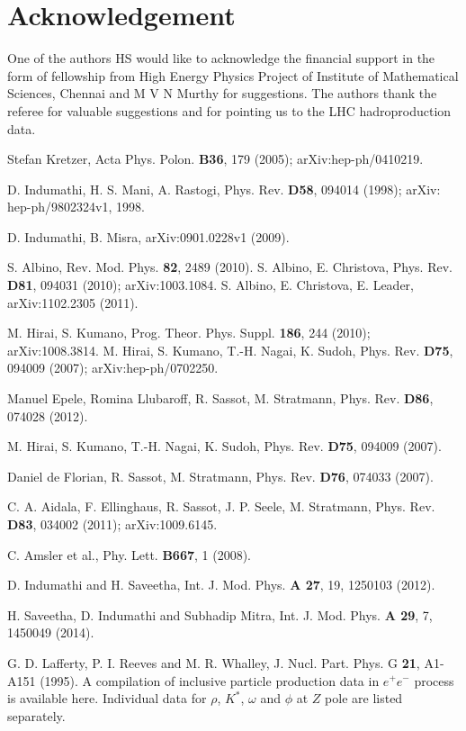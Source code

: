 \documentclass{ws-ijmpa}
\begin{document}
\section*{Acknowledgement}
\label{Acknow}
One of the authors HS would like to acknowledge the financial support
in the form of fellowship from High Energy Physics Project of Institute
of Mathematical Sciences, Chennai and M V N Murthy for suggestions. The
authors thank the referee for valuable suggestions and for pointing us
to the LHC hadroproduction data.

\begin{thebibliography}{99}
Stefan Kretzer, Acta Phys. Polon. {\bf B36}, 179 (2005); arXiv:hep-ph/0410219.

D. Indumathi, H. S. Mani, A. Rastogi, Phys. Rev. {\bf D58}, 094014
(1998); arXiv: hep-ph/9802324v1, 1998.

D. Indumathi, B. Misra, arXiv:0901.0228v1 (2009).

S. Albino, Rev. Mod. Phys. {\bf 82}, 2489 (2010).
S. Albino, E. Christova, Phys. Rev. {\bf D81}, 094031 (2010); arXiv:1003.1084.
S. Albino, E. Christova, E. Leader, arXiv:1102.2305 (2011).

M. Hirai, S. Kumano, Prog. Theor. Phys. Suppl. {\bf 186}, 244 (2010);
arXiv:1008.3814.
M. Hirai, S. Kumano, T.-H. Nagai, K. Sudoh, Phys. Rev. {\bf D75},
094009 (2007); arXiv:hep-ph/0702250.

Manuel Epele, Romina Llubaroff, R. Sassot, M. Stratmann, Phys. Rev. {\bf D86}, 074028 (2012).

M. Hirai, S. Kumano, T.-H. Nagai, K. Sudoh, Phys. Rev. {\bf D75}, 094009 (2007).

Daniel de Florian, R. Sassot, M. Stratmann, Phys. Rev. {\bf D76}, 074033 (2007).

C. A. Aidala, F. Ellinghaus, R. Sassot, J. P. Seele, M. Stratmann,
Phys. Rev. {\bf D83}, 034002 (2011); arXiv:1009.6145.

C. Amsler et al., Phy. Lett. {\bf B667}, 1 (2008).

D. Indumathi and H. Saveetha,
Int. J. Mod. Phys. {\bf A 27}, 19, 1250103 (2012).

H. Saveetha, D. Indumathi and Subhadip Mitra,
Int. J. Mod. Phys. {\bf A 29}, 7, 1450049 (2014).

G. D. Lafferty, P. I. Reeves and M. R. Whalley, J. Nucl. Part. Phys. G
{\bf 21}, A1-A151 (1995). A compilation of inclusive particle production
data in $e^+e^-$ process is available here. Individual data for $\rho$,
$K^*$, $\omega$ and $\phi$ at $Z$ pole are listed separately.


\end{thebibliography}
\end{document}
